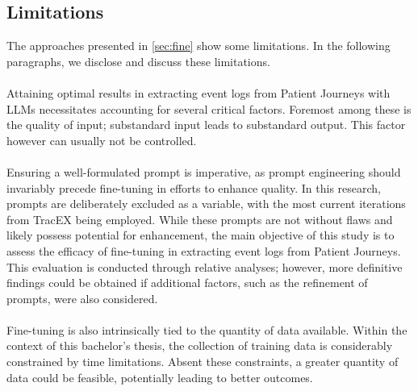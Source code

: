 \subsection{Limitations}\label{sec:limitations}
The approaches presented in \autoref{sec:fine} show some limitations. In the following paragraphs, we disclose and discuss these limitations.\\\\
Attaining optimal results in extracting event logs from Patient Journeys with LLMs necessitates accounting for several critical factors. Foremost among these is the quality of input; substandard input leads to substandard output. This factor however can usually not be controlled.\\\\
Ensuring a well-formulated prompt is imperative, as prompt engineering should invariably precede fine-tuning in efforts to enhance quality.
In this research, prompts are deliberately excluded as a variable, with the most current iterations from TracEX being employed. While these prompts are not without flaws and likely possess potential for enhancement, the main objective of this study is to assess the efficacy of fine-tuning in extracting event logs from Patient Journeys. This evaluation is conducted through relative analyses; however, more definitive findings could be obtained if additional factors, such as the refinement of prompts, were also considered.\\\\
Fine-tuning is also intrinsically tied to the quantity of data available. Within the context of this bachelor’s thesis, the collection of training data is considerably constrained by time limitations. Absent these constraints, a greater quantity of data could be feasible, potentially leading to better outcomes.\\\\

